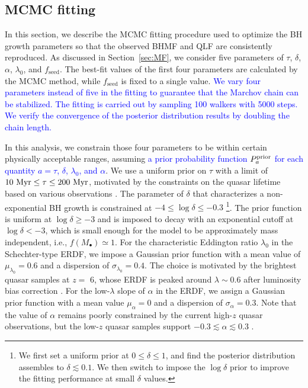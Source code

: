 \documentclass[twocolumn, twocolappendix]{aastex63}
\newcommand{\tlife}{\tau}
\newcommand{\fseed}{f_\mathrm{seed}}
\newcommand{\blue}[1]{\textcolor{blue}{ #1}}
\begin{document}
\begin{CJK*}{UTF8}{gbsn}
\vspace{2mm}
\subsection{MCMC fitting}\label{sec:fitting}



In this section, we describe the MCMC fitting procedure used to optimize 
the BH growth parameters so that the observed BHMF and QLF are consistently reproduced. 
As discussed in Section~\ref{sec:MF}, we consider five parameters of $\tlife$, $\delta$, $\alpha$, $\lambda_0$, and $\fseed$.
The best-fit values of the first four parameters are calculated by the MCMC method, while $\fseed$ is fixed to a single value.
\blue{
We vary four parameters instead of five in the fitting to guarantee that the Marchov chain can be stabilized. 
The fitting is carried out by sampling 100 walkers with 5000 steps.
We verify the convergence of the posterior distribution results by doubling the chain length.
}

In this analysis, we constrain those four parameters to be within certain physically acceptable ranges, 
assuming \blue{a prior probability function $P^{\rm prior}_a$ for each quantity $a=\tlife$, $\delta$, $\lambda_0$, and $\alpha$}.
We use a uniform prior on $\tlife$ with a limit of $10~{\rm Myr} \leq \tlife \leq 200~{\rm Myr}$,
motivated by the constraints on the quasar lifetime based on various observations
\citep[e.g.,][]{2004cbhg.symp..169M}.
The parameter of $\delta$ that characterizes a non-exponential BH growth 
is constrained at $-4 \leq \log \delta \leq -0.3$
\footnote[4]{ We first set a uniform prior at $0\leq \delta \leq 1$, 
and find the posterior distribution assembles to $\delta \lesssim 0.1$.
We then switch to impose the $\log \delta$ prior to improve the fitting performance at small $\delta$ values.}.
The prior function is uniform at $\log \delta \geq -3$ and is imposed to decay with an exponential cutoff at $\log \delta < -3$,
which is small enough for the model to be approximately mass independent, i.e., $f(M_\bullet)\simeq1$.
For the characteristic Eddington ratio $\lambda_0$ in the Schechter-type ERDF, 
we impose a Gaussian prior function with a mean value of $\mu_{\lambda_0}=0.6$ and a dispersion of $\sigma_{\lambda_0}=0.4$.
The choice is motivated by the brightest quasar samples at $z=$ 6, whose ERDF is peaked around $\lambda \sim 0.6$ 
after luminosity bias correction \citep[e.g.,][]{2010AJ....140..546W}.
For the low-$\lambda$ slope of $\alpha$ in the ERDF, we assign a Gaussian prior function with a mean value 
$\mu_{\alpha}=0$ and a dispersion of $\sigma_{\alpha}=0.3$.
Note that the value of $\alpha$ remains poorly constrained by the current high-$z$ quasar observations,
but the low-$z$ quasar samples support $-0.3 \lesssim \alpha \lesssim 0.3$ 
\blue{\citep[e.g., see the mass-integrated ERDF for comparison; the right panel of Figure 21 in][]{2015MNRAS.447.2085S}}.



\end{CJK*}
\end{document}
